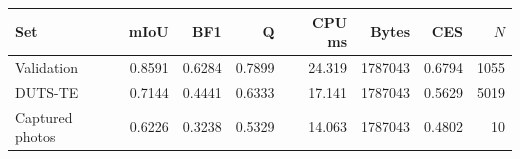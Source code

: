 \begin{tabular}{lrrrrrrr}
\toprule
Set & mIoU & BF1 & Q & CPU ms & Bytes & CES & $N$ \\
\midrule
Validation & 0.8591 & 0.6284 & 0.7899 & 24.319 & 1787043 & 0.6794 & 1055 \\
DUTS-TE & 0.7144 & 0.4441 & 0.6333 & 17.141 & 1787043 & 0.5629 & 5019 \\
Captured photos & 0.6226 & 0.3238 & 0.5329 & 14.063 & 1787043 & 0.4802 & 10 \\
\bottomrule
\end{tabular}
